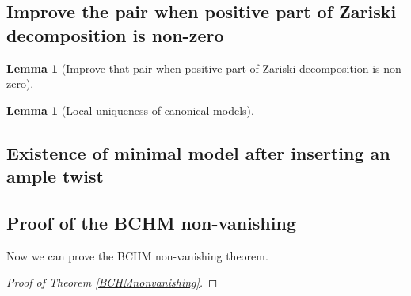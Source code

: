 \documentclass[11pt]{article}
\theoremstyle{definition}
\newtheorem{lemma}[theorem]{Lemma}
\begin{document}
	
	\subsection{Improve the pair when positive part of Zariski decomposition is non-zero}
	\begin{lemma}[Improve that pair when positive part of Zariski decomposition is non-zero]
		
	\end{lemma}
	\begin{lemma}[Local uniqueness of canonical models]
		
	\end{lemma}
	\subsection{Existence of minimal model after inserting an ample twist}
	
	\subsection{Proof of the BCHM non-vanishing}
	Now we can prove the BCHM non-vanishing theorem.
	\begin{proof}[Proof of Theorem \ref{BCHMnonvanishing}]
		
	\end{proof}
	
	
	
	
\end{document}
